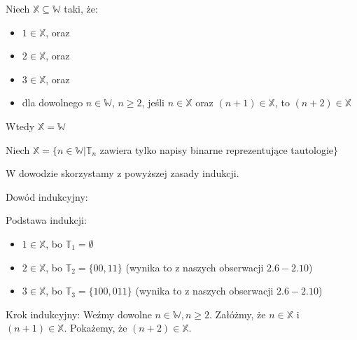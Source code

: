 Niech $\mathbb{X} \subseteq \mathbb{W}$ taki, że:
\begin{itemize}
	\item $1 \in \mathbb{X}$, oraz
	\item $2 \in \mathbb{X}$, oraz
	\item $3 \in \mathbb{X}$, oraz
	\item dla dowolnego $n \in \mathbb{W}$, $n \geq 2$, jeśli $n \in \mathbb{X}$ oraz $(n + 1) \in \mathbb{X}$, to $(n + 2) \in \mathbb{X}$
\end{itemize}
Wtedy $\mathbb{X} = \mathbb{W}$
\n

\noindent
Niech $\mathbb{X} = \{n \in \mathbb{W} | \mathbb{T}_n$ zawiera tylko napisy binarne reprezentujące tautologie$\}$
\n

\noindent
W dowodzie skorzystamy z powyższej zasady indukcji.
\n

\noindent
Dowód indukcyjny:
\n

\noindent
Podstawa indukcji:
\begin{itemize}
\item $1 \in \mathbb{X}$, bo $\mathbb{T}_1 = \emptyset$
\item $2 \in \mathbb{X}$, bo $\mathbb{T}_2 = \{00, 11\}$ (wynika to z naszych obserwacji $2.6 - 2.10$)
\item $3 \in \mathbb{X}$, bo $\mathbb{T}_3 = \{100, 011\}$ (wynika to z naszych obserwacji $2.6 - 2.10$)
\end{itemize}

\noindent
Krok indukcyjny:
\n
\noindent
Weźmy dowolne $n \in \mathbb{W}, n \geq 2$. Załóżmy, że $n \in \mathbb{X}$ i $(n + 1) \in \mathbb{X}$. Pokażemy, że $(n + 2) \in \mathbb{X}$.
\n

